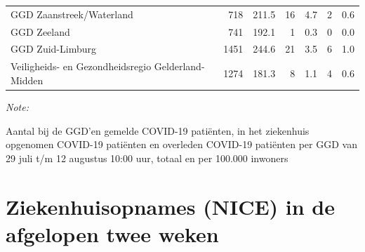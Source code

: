 \documentclass[
  english,
  man,floatsintext]{apa6}
\begin{document}
\begin{table}
\begin{threeparttable}
\begin{tabular}{lrrrrrr}
GGD Zaanstreek/Waterland & 718 & 211.5 & 16 & 4.7 & 2 & 0.6\\
GGD Zeeland & 741 & 192.1 & 1 & 0.3 & 0 & 0.0\\
GGD Zuid-Limburg & 1451 & 244.6 & 21 & 3.5 & 6 & 1.0\\
Veiligheids- en Gezondheidsregio Gelderland-Midden & 1274 & 181.3 & 8 & 1.1 & 4 & 0.6\\
\bottomrule
\end{tabular}
\begin{tablenotes}
\item \textit{Note: } 
\item Aantal bij de GGD’en gemelde COVID-19 patiënten, in het ziekenhuis opgenomen COVID-19 patiënten en overleden COVID-19 patiënten per GGD van 29 juli t/m 12 augustus 10:00 uur, totaal en per 100.000 inwoners
\end{tablenotes}
\end{threeparttable}
\endgroup{}
\end{table}

\newpage

\hypertarget{ziekenhuisopnames-nice-in-de-afgelopen-twee-weken}{%
\section{Ziekenhuisopnames (NICE) in de afgelopen twee weken}\label{ziekenhuisopnames-nice-in-de-afgelopen-twee-weken}}
\end{document}

